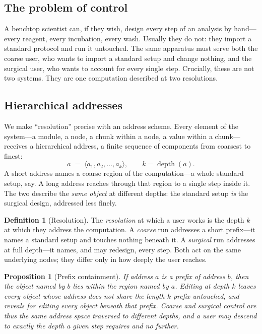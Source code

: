 \documentclass[11pt,a4paper,twocolumn]{article}
\newtheorem{proposition}[theorem]{Proposition}
\theoremstyle{definition}
\newtheorem{definition}[theorem]{Definition}
\begin{document}
\subsection{The problem of control}

A benchtop scientist can, if they wish, design every step of an analysis by
hand---every reagent, every incubation, every wash. Usually they do not: they
import a standard protocol and run it untouched. The same apparatus must serve
both the coarse user, who wants to import a standard setup and change nothing,
and the surgical user, who wants to account for every single step. Crucially,
these are not two systems. They are one computation described at two
resolutions.

\subsection{Hierarchical addresses}

We make ``resolution'' precise with an address scheme. Every element of the
system---a module, a node, a chunk within a node, a value within a
chunk---receives a hierarchical address, a finite sequence of components from
coarsest to finest:
\[
a \;=\; \langle a_1, a_2, \dots, a_k \rangle,
\qquad k = \operatorname{depth}(a).
\]
A short address names a coarse region of the computation---a whole standard
setup, say. A long address reaches through that region to a single step inside
it. The two describe the \emph{same object} at different depths: the standard
setup \emph{is} the surgical design, addressed less finely.

\begin{definition}[Resolution]
\label{def:resolution}
The \emph{resolution} at which a user works is the depth $k$ at which they
address the computation. A \emph{coarse} run addresses a short prefix---it names
a standard setup and touches nothing beneath it. A \emph{surgical} run addresses
at full depth---it names, and may redesign, every step. Both act on the same
underlying nodes; they differ only in how deeply the user reaches.
\end{definition}

\begin{proposition}[Prefix containment]
\label{prop:prefix}
If address $a$ is a prefix of address $b$, then the object named by $b$ lies
within the region named by $a$. Editing at depth $k$ leaves every object whose
address does not share the length-$k$ prefix untouched, and reveals for editing
every object beneath that prefix. Coarse and surgical control are thus the
\emph{same} address space traversed to different depths, and a user may descend
to exactly the depth a given step requires and no further.
\end{proposition}
\end{document}
